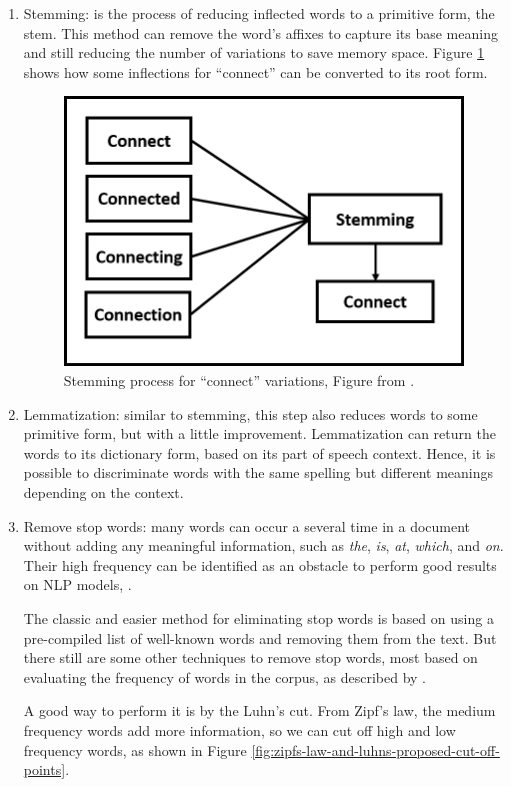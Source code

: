 	\begin{enumerate}
		\item Stemming: is the process of reducing inflected words to a primitive form, the stem. This method can remove the word's affixes to capture its base meaning and still reducing the number of variations to save memory space. Figure \ref{fig:stemming} shows how some inflections for ``connect'' can be converted to its root form.
		
		\begin{figure}[h!]
			\centering
			\includegraphics[width=0.45\linewidth]{01.Chapters/02.Background/stemming}
			\caption{Stemming process for ``connect'' variations, Figure from  \cite{vijayarani2015preprocessing}.}
			\label{fig:stemming}
		\end{figure}
		
		
		\item Lemmatization: similar to stemming, this step also reduces words to some primitive form, but with a little improvement. Lemmatization can return the words to its dictionary form, based on its part of speech context. Hence, it is possible to discriminate words with the same spelling but different meanings depending on the context. 	
				
		\item Remove stop words:
		many words can occur a several time in a document without adding any meaningful information, such as \textit{the}, \textit{is}, \textit{at}, \textit{which}, and \textit{on}. Their high frequency can be identified as an obstacle to perform good results on NLP models, \cite{kannan2014preprocessing}. 
		
		The classic and easier method for eliminating stop words is based on using a pre-compiled list of well-known words and removing them from the text.
		But there still are some other techniques to remove stop words, most based on evaluating the frequency of words in the corpus, as described by \cite{vijayarani2015preprocessing}. 

		A good way to perform it is by the Luhn's cut. From Zipf's law, the medium frequency words add more information, so we can cut off high and low frequency words, as shown in Figure \ref{fig:zipfs-law-and-luhns-proposed-cut-off-points}.
		

\end{enumerate}
